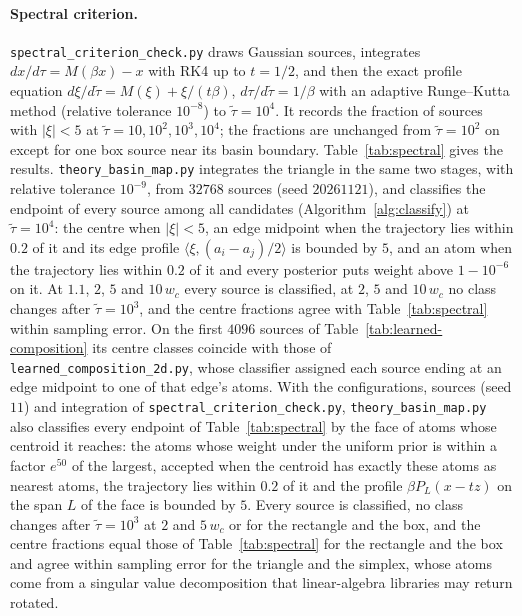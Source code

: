 \documentclass{article} %
\theoremstyle{plain}
\theoremstyle{definition}
\theoremstyle{remark}
\begin{document}
\paragraph{Spectral criterion.} \texttt{spectral\_criterion\_check.py} draws Gaussian sources,
integrates $dx/d\tau=M(\beta x)-x$ with RK4 up to $t=1/2$, and then the exact profile equation
$d\xi/d\tilde\tau=M(\xi)+\xi/(t\beta)$, $d\tau/d\tilde\tau=1/\beta$ with an adaptive Runge--Kutta method
(relative tolerance $10^{-8}$) to $\tilde\tau=10^4$. It records the fraction of sources with $|\xi|<5$
at $\tilde\tau=10,10^2,10^3,10^4$; the fractions are unchanged from $\tilde\tau=10^2$ on except for one box
source near its basin boundary. Table~\ref{tab:spectral} gives the results.
\texttt{theory\_basin\_map.py} integrates the triangle in the same two stages, with relative
tolerance $10^{-9}$, from $32768$ sources (seed $20261121$), and classifies the endpoint of every
source among all candidates (Algorithm~\ref{alg:classify}) at $\tilde\tau=10^4$: the centre when $|\xi|<5$, an edge midpoint when the
trajectory lies within $0.2$ of it and its edge profile $\langle\xi,(a_i-a_j)/2\rangle$ is bounded
by $5$, and an atom when the trajectory lies within $0.2$ of it and every posterior puts weight
above $1-10^{-6}$ on it. At $1.1$, $2$, $5$ and $10\,w_c$ every source is classified, at $2$, $5$
and $10\,w_c$ no class changes after $\tilde\tau=10^3$, and the centre fractions agree with
Table~\ref{tab:spectral} within sampling error. On the first $4096$ sources of
Table~\ref{tab:learned-composition} its centre classes coincide with those of
\texttt{learned\_composition\_2d.py}, whose classifier assigned each source ending at an edge
midpoint to one of that edge's atoms. With the configurations, sources (seed $11$) and integration
of \texttt{spectral\_criterion\_check.py}, \texttt{theory\_basin\_map.py} also classifies every
endpoint of Table~\ref{tab:spectral} by the face of atoms whose centroid it reaches: the atoms whose
weight under the uniform prior is within a factor $e^{50}$ of the largest, accepted when the
centroid has exactly these atoms as nearest atoms, the trajectory lies within $0.2$ of it and the
profile $\beta P_L(x-tz)$ on the span $L$ of the face is bounded by $5$. Every source is
classified, no class changes after $\tilde\tau=10^3$ at $2$ and $5\,w_c$ or for the rectangle and the
box, and the centre fractions equal those of Table~\ref{tab:spectral} for the rectangle and the box
and agree within sampling error for the triangle and the simplex, whose atoms come from a singular
value decomposition that linear-algebra libraries may return rotated.
\end{document}
